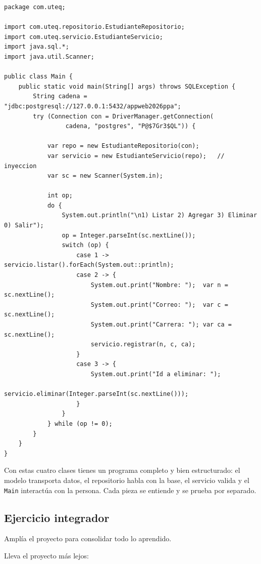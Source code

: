 \documentclass[11pt]{article}
\begin{document}
\begin{cajacodigo}
\begin{lstlisting}[style=java]
package com.uteq;

import com.uteq.repositorio.EstudianteRepositorio;
import com.uteq.servicio.EstudianteServicio;
import java.sql.*;
import java.util.Scanner;

public class Main {
    public static void main(String[] args) throws SQLException {
        String cadena = "jdbc:postgresql://127.0.0.1:5432/appweb2026ppa";
        try (Connection con = DriverManager.getConnection(
                 cadena, "postgres", "P@$7Gr3$QL")) {

            var repo = new EstudianteRepositorio(con);
            var servicio = new EstudianteServicio(repo);   // inyeccion
            var sc = new Scanner(System.in);

            int op;
            do {
                System.out.println("\n1) Listar 2) Agregar 3) Eliminar 0) Salir");
                op = Integer.parseInt(sc.nextLine());
                switch (op) {
                    case 1 -> servicio.listar().forEach(System.out::println);
                    case 2 -> {
                        System.out.print("Nombre: ");  var n = sc.nextLine();
                        System.out.print("Correo: ");  var c = sc.nextLine();
                        System.out.print("Carrera: "); var ca = sc.nextLine();
                        servicio.registrar(n, c, ca);
                    }
                    case 3 -> {
                        System.out.print("Id a eliminar: ");
                        servicio.eliminar(Integer.parseInt(sc.nextLine()));
                    }
                }
            } while (op != 0);
        }
    }
}
\end{lstlisting}
\end{cajacodigo}
\vspace{2pt}
Con estas cuatro clases tienes un programa completo y bien estructurado: el modelo transporta datos, el repositorio habla con la base, el servicio valida y el \texttt{Main} interactúa con la persona. Cada pieza se entiende y se prueba por separado.

\subsection{Ejercicio integrador}
Amplía el proyecto para consolidar todo lo aprendido.

Lleva el proyecto más lejos:
\end{document}
